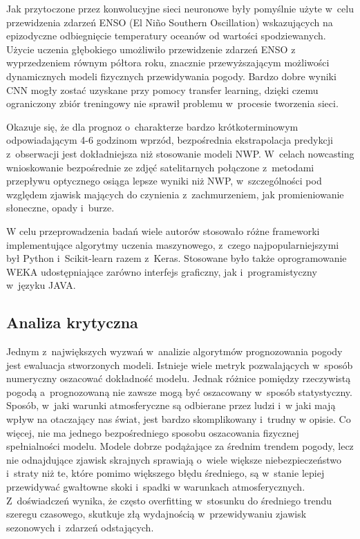Jak przytoczone przez \cite{ai-revolutionises-weather-prediction}
konwolucyjne sieci neuronowe były pomyślnie użyte w~celu przewidzenia zdarzeń ENSO 
(El Niño Southern Oscillation) wskazujących na epizodyczne odbiegnięcie temperatury oceanów 
od wartości spodziewanych. Użycie uczenia głębokiego umożliwiło przewidzenie zdarzeń ENSO z~
wyprzedzeniem równym półtora roku, znacznie przewyższającym możliwości dynamicznych modeli
fizycznych przewidywania pogody. Bardzo dobre wyniki CNN mogły zostać uzyskane przy pomocy
transfer learning, dzięki czemu ograniczony zbiór treningowy nie sprawił problemu w~procesie 
tworzenia sieci.

Okazuje się, że dla prognoz o~charakterze bardzo krótkoterminowym odpowiadającym 4-6 godzinom 
wprzód, bezpośrednia ekstrapolacja predykcji z~obserwacji jest dokładniejsza niż 
stosowanie modeli NWP\cite{ai-revolutionises-weather-prediction}. W~celach nowcasting
wnioskowanie bezpośrednie ze zdjęć satelitarnych połączone z~metodami przepływu optycznego osiąga
lepsze wyniki niż NWP, w~szczególności pod względem zjawisk mających do czynienia z~zachmurzeniem,
jak promieniowanie słoneczne, opady i~burze. 

W celu przeprowadzenia badań wiele autorów stosowało różne frameworki implementujące algorytmy uczenia
maszynowego, z~czego najpopularniejszymi był Python\cite{python} i~Scikit-learn\cite{sklearn}
razem z~Keras\cite{keras}. Stosowane było także oprogramowanie WEKA udostępniające zarówno interfejs
graficzny, jak i~programistyczny w~języku JAVA.


\subsection{Analiza krytyczna}

Jednym z~największych wyzwań w~analizie algorytmów prognozowania pogody jest ewaluacja 
stworzonych modeli. Istnieje wiele metryk pozwalających w~sposób numeryczny oszacować
dokładność modelu. Jednak różnice pomiędzy rzeczywistą pogodą a~prognozowaną nie zawsze
mogą być oszacowany w~sposób statystyczny. Sposób, w~jaki warunki atmosferyczne są odbierane
przez ludzi i~w jaki mają wpływ na otaczający nas świat, jest bardzo skomplikowany i~trudny
w opisie. Co więcej, nie ma jednego bezpośredniego sposobu oszacowania fizycznej spełnialności
modelu\cite{deep-learning-for-improving-numerical}.
Modele dobrze podążające za średnim trendem pogody, lecz nie odnajdujące
zjawisk skrajnych sprawiają o~wiele większe niebezpieczeństwo i~straty niż te, które
pomimo większego błędu średniego, są w~stanie lepiej przewidywać gwałtowne skoki i~spadki
w warunkach atmosferycznych. Z~doświadczeń wynika, że często overfitting w~stosunku do
średniego trendu szeregu czasowego, skutkuje złą wydajnością w~przewidywaniu
zjawisk sezonowych i~zdarzeń odstających.

